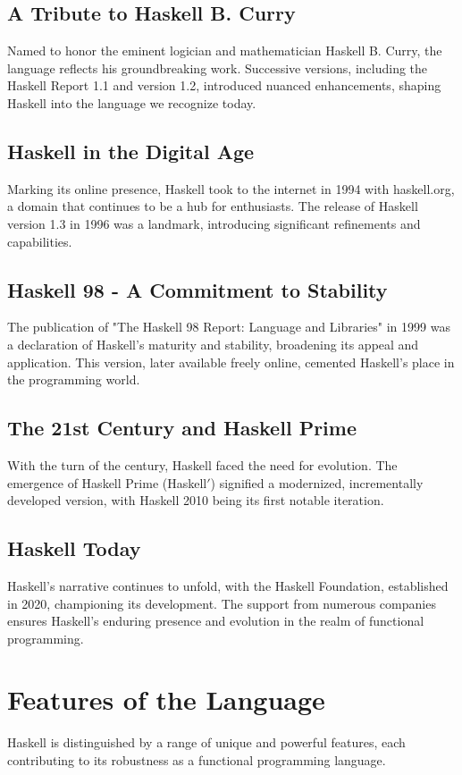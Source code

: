 \documentclass[a4paper, 10pt]{article}
\begin{document}
        \subsection{A Tribute to Haskell B. Curry}
            Named to honor the eminent logician and mathematician Haskell B. Curry, the language reflects his groundbreaking work. Successive versions, including the Haskell Report 1.1 and version 1.2, introduced nuanced enhancements, shaping Haskell into the language we recognize today.

        \subsection{Haskell in the Digital Age}
            Marking its online presence, Haskell took to the internet in 1994 with haskell.org, a domain that continues to be a hub for enthusiasts. The release of Haskell version 1.3 in 1996 was a landmark, introducing significant refinements and capabilities.

        \subsection{Haskell 98 - A Commitment to Stability}
            The publication of "The Haskell 98 Report: Language and Libraries" in 1999 was a declaration of Haskell's maturity and stability, broadening its appeal and application. This version, later available freely online, cemented Haskell's place in the programming world.

        \subsection{The 21st Century and Haskell Prime}
            With the turn of the century, Haskell faced the need for evolution. The emergence of Haskell Prime (Haskell$'$) signified a modernized, incrementally developed version, with Haskell 2010 being its first notable iteration.

        \subsection{Haskell Today}
            Haskell's narrative continues to unfold, with the Haskell Foundation, established in 2020, championing its development. The support from numerous companies ensures Haskell's enduring presence and evolution in the realm of functional programming.

    \pagebreak
	\section{Features of the Language}
        Haskell is distinguished by a range of unique and powerful features, each contributing to its robustness as a functional programming language.
\end{document}
